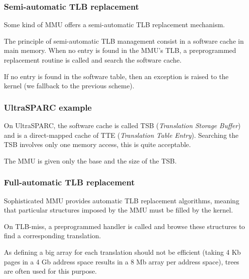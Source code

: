 
\begin{frame}
  \frametitle{Semi-automatic TLB replacement}

  Some kind of MMU offers a semi-automatic TLB replacement mechanism.

  \-

  The principle of semi-automatic TLB management consist in a software
  cache in main memory. When no entry is found in the MMU's TLB, a
  preprogrammed replacement routine is called and search the software
  cache.

  \-

  If no entry is found in the software table, then an exception is
  raised to the kernel (we fallback to the previous scheme).

\end{frame}


\begin{frame}
  \frametitle{UltraSPARC example}

  On UltraSPARC, the software cache is called TSB (\emph{Translation
  Storage Buffer}) and is a direct-mapped cache of TTE
  (\emph{Translation Table Entry}). Searching the TSB involves only
  one memory access, this is quite acceptable.

  \-

  \begin{center}
  \end{center}

  The MMU is given only the base and the size of the TSB.

\end{frame}


\begin{frame}
  \frametitle{Full-automatic TLB replacement}

  Sophisticated MMU provides automatic TLB replacement algorithms,
  meaning that particular structures imposed by the MMU must be filled
  by the kernel.

  \-

  On TLB-miss, a preprogrammed handler is called and browse these
  structures to find a corresponding translation.

  \-

  As defining a big array for each translation should not be efficient
  (taking 4 Kb pages in a 4 Gb address space results in a 8 Mb array
  per address space), trees are often used for this purpose.

\end{frame}

